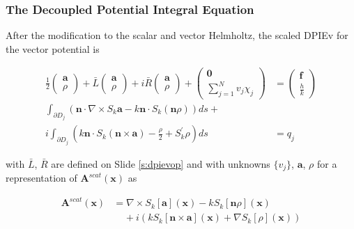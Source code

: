 \documentclass{beamer}
\newcommand{\bvec}[1]{\boldsymbol{#1}}
\begin{document}
	\begin{frame}
	\frametitle{The Decoupled Potential Integral Equation}
	After the modification to the scalar and vector Helmholtz, the scaled DPIEv for the vector potential is
	
	\begin{align*}
	\frac{1}{2}\begin{pmatrix}
	\bvec{a} \\
	\rho
	\end{pmatrix}
	+ 
	\bar{L} \begin{pmatrix}
	\bvec{a} \\
	\rho
	\end{pmatrix}
	+
	i \bar{R} \begin{pmatrix}
	\bvec{a} \\
	\rho
	\end{pmatrix}
	+ \begin{pmatrix}
	\bvec{0} \\
	\sum_{j=1}^N v_j \chi_j
	\end{pmatrix}
	&= \begin{pmatrix}
	\bvec{f} \\
	\frac{h}{k}
	\end{pmatrix} \\
	\int_{\partial D_j} \left(  \bvec{n} \cdot \nabla \times S_k\bvec{a} - k \bvec{n} \cdot S_k\left(\bvec{n} \rho \right) \right) ds + \;\;\;\;\;\;\;\;\;&\\
	i \int_{\partial D_j} \left(k \bvec{n} \cdot S_k\left(\bvec{n} \times \bvec{a}\right) - \frac{\rho}{2} + S_k^{'}\rho \right) ds &= q_j
	\end{align*}
	
	with $\bar{L}$, $\bar{R}$ are defined on Slide \ref{s:dpievop} and with unknowns $\lbrace v_j\rbrace$, $\bvec{a}$, $\rho$ for a representation of $\bvec{A}^{scat}(\bvec{x})$ as
	
	\begin{align*}
	\bvec{A}^{scat}(\bvec{x}) &= \nabla \times S_k[\bvec{a}](\bvec{x}) - k S_k[\bvec{n}\rho](\bvec{x}) \\
	&\;\;\;\; + i \left(k S_k[\bvec{n} \times \bvec{a}](\bvec{x}) + \nabla S_k[\rho](\bvec{x})\right)
	\end{align*}
	
	\end{frame}
\end{document}
